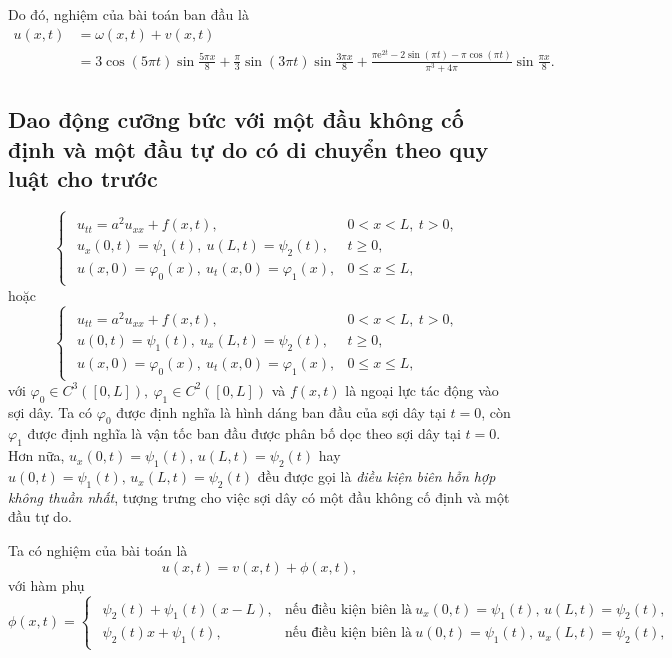 \documentclass[10pt, a4paper]{article}
\begin{document}
	Do đó, nghiệm của bài toán ban đầu là \begin{align*}
		u(x,t)&=\omega(x,t)+v(x,t)\\
		&=3\cos(5\pi t)\sin\frac{5\pi x}{8}+\frac\pi3\sin(3\pi t)\sin\frac{3\pi x}{8}+\frac{\pi\mathrm e^{2t}-2\sin(\pi t)-\pi\cos(\pi t)}{\pi^3+4\pi}\sin\frac{\pi x}{8}.
	\end{align*}
	\subsection{Dao động cưỡng bức với một đầu không cố định và một đầu tự do có di chuyển theo quy luật cho trước}
	\vspace{2mm}
	\begin{tcolorbox}[enhanced,colback=blue!5!white,colframe=blue!75!black,sharp corners=all,shadow={0mm}{0mm}{-1.5mm}%
		{fill=blue!75!red,opacity=0.3},title=\textbf{Dạng của bài toán}]
		$$\begin{cases}
			\begin{array}{ll}
				u_{tt}=a^2u_{xx}+f(x,t), & 0<x<L,~t>0,\\
				u_x(0,t)=\psi_1(t),~u(L,t)=\psi_2(t), & t\ge0,\\
				u(x,0)=\varphi_0(x),~u_t(x,0)=\varphi_1(x), & 0\le x\le L,
			\end{array}
		\end{cases}$$
		hoặc $$\begin{cases}
			\begin{array}{ll}
				u_{tt}=a^2u_{xx}+f(x,t), & 0<x<L,~t>0,\\
				u(0,t)=\psi_1(t),~u_x(L,t)=\psi_2(t), & t\ge0,\\
				u(x,0)=\varphi_0(x),~u_t(x,0)=\varphi_1(x), & 0\le x\le L,
			\end{array}
		\end{cases}$$
		với $\varphi_0\in C^3([0,L]),~\varphi_1\in C^2([0,L])$ và $f(x,t)$ là ngoại lực tác động vào sợi dây.\vskip7pt
		\quad Ta có $\varphi_0$ được định nghĩa là hình dáng ban đầu của sợi dây tại $t=0$, còn $\varphi_1$ được định nghĩa là vận tốc ban đầu được phân bố dọc theo sợi dây tại $t=0$.\vskip7pt
		\quad Hơn nữa, $u_x(0,t)=\psi_1(t),\,u(L,t)=\psi_2(t)$ hay $u(0,t)=\psi_1(t),\,u_x(L,t)=\psi_2(t)$ đều được gọi là \textit{điều kiện biên hỗn hợp không thuần nhất}, tượng trưng cho việc sợi dây có một đầu không cố định và một đầu tự do.
	\end{tcolorbox}
	\vspace{2mm}
	Ta có nghiệm của bài toán là $$u(x,t)=v(x,t)+\phi(x,t),$$ với hàm phụ $$\phi(x,t)=\begin{cases}
		\begin{array}{ll}
			\psi_2(t)+\psi_1(t)(x-L), & \text{nếu điều kiện biên là}~u_x(0,t)=\psi_1(t),\,u(L,t)=\psi_2(t), \\
			\psi_2(t)x+\psi_1(t), & \text{nếu điều kiện biên là}~u(0,t)=\psi_1(t),\,u_x(L,t)=\psi_2(t),
		\end{array}
	\end{cases}$$
\end{document}
